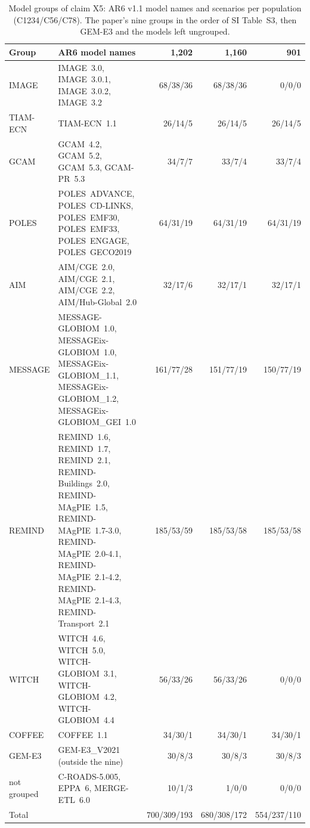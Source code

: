 \documentclass[11pt,a4paper]{article}
\begin{document}
\begin{table}[H]
\caption{Model groups of claim X5: AR6 v1.1 model names and
scenarios per population (C1234/C56/C78). The paper's nine groups in the
order of SI Table~S3, then GEM-E3 and the models left ungrouped.}
\label{tab:groups}
\footnotesize
\begin{tabularx}{\textwidth}{@{}l Y r r r@{}}
\toprule
Group & AR6 model names & 1{,}202 & 1{,}160 & 901\\
\midrule
IMAGE & \mbox{IMAGE 3.0}, \mbox{IMAGE 3.0.1}, \mbox{IMAGE 3.0.2}, \mbox{IMAGE 3.2} & 68/38/36 & 68/38/36 & 0/0/0\\
TIAM-ECN & \mbox{TIAM-ECN 1.1} & 26/14/5 & 26/14/5 & 26/14/5\\
GCAM & \mbox{GCAM 4.2}, \mbox{GCAM 5.2}, \mbox{GCAM 5.3}, \mbox{GCAM-PR 5.3} & 34/7/7 & 33/7/4 & 33/7/4\\
POLES & \mbox{POLES ADVANCE}, \mbox{POLES CD-LINKS}, \mbox{POLES EMF30}, \mbox{POLES EMF33}, \mbox{POLES ENGAGE}, \mbox{POLES GECO2019} & 64/31/19 & 64/31/19 & 64/31/19\\
AIM & \mbox{AIM/CGE 2.0}, \mbox{AIM/CGE 2.1}, \mbox{AIM/CGE 2.2}, \mbox{AIM/Hub-Global 2.0} & 32/17/6 & 32/17/1 & 32/17/1\\
MESSAGE & \mbox{MESSAGE-GLOBIOM 1.0}, \mbox{MESSAGEix-GLOBIOM 1.0}, \mbox{MESSAGEix-GLOBIOM\_1.1}, \mbox{MESSAGEix-GLOBIOM\_1.2}, \mbox{MESSAGEix-GLOBIOM\_GEI 1.0} & 161/77/28 & 151/77/19 & 150/77/19\\
REMIND & \mbox{REMIND 1.6}, \mbox{REMIND 1.7}, \mbox{REMIND 2.1}, \mbox{REMIND-Buildings 2.0}, \mbox{REMIND-MAgPIE 1.5}, \mbox{REMIND-MAgPIE 1.7-3.0}, \mbox{REMIND-MAgPIE 2.0-4.1}, \mbox{REMIND-MAgPIE 2.1-4.2}, \mbox{REMIND-MAgPIE 2.1-4.3}, \mbox{REMIND-Transport 2.1} &
  185/53/59 & 185/53/58 & 185/53/58\\
WITCH & \mbox{WITCH 4.6}, \mbox{WITCH 5.0}, \mbox{WITCH-GLOBIOM 3.1}, \mbox{WITCH-GLOBIOM 4.2}, \mbox{WITCH-GLOBIOM 4.4} & 56/33/26 & 56/33/26 & 0/0/0\\
COFFEE & \mbox{COFFEE 1.1} & 34/30/1 & 34/30/1 & 34/30/1\\
\midrule
GEM-E3 & \mbox{GEM-E3\_V2021} (outside the nine) & 30/8/3 & 30/8/3 & 30/8/3\\
not grouped & \mbox{C-ROADS-5.005}, \mbox{EPPA 6}, \mbox{MERGE-ETL 6.0} & 10/1/3 & 1/0/0 & 0/0/0\\
\midrule
Total & & 700/309/193 & 680/308/172 & 554/237/110\\
\bottomrule
\end{tabularx}
\end{table}
\end{document}
